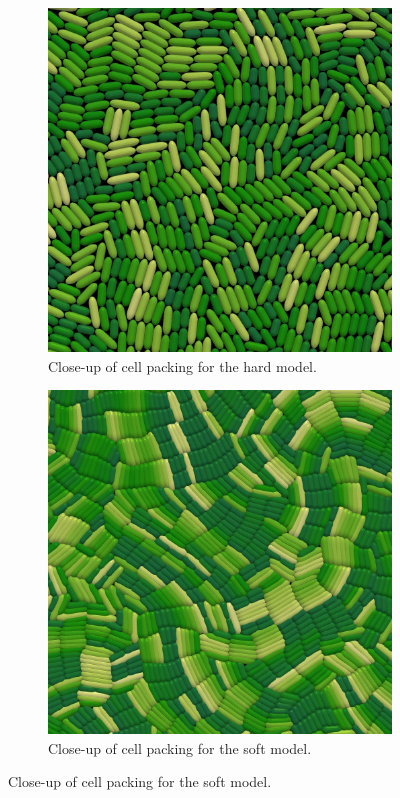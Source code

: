 \documentclass[conference]{IEEEtran}
\begin{document}
\begin{figure}[H]
    \centering
    \begin{subfigure}[b]{0.49\columnwidth}
        \centering
        \includegraphics[width=\linewidth]{figures/comparison_plots/density_hard.jpeg}
        \caption{Close-up of cell packing for the hard model.}
        \label{fig:packing_hard}
    \end{subfigure}
    \begin{subfigure}[b]{0.49\columnwidth}
        \centering
        \includegraphics[width=\linewidth]{figures/comparison_plots/density_soft.jpeg}
        \caption{Close-up of cell packing for the soft model.}
        \label{fig:packing_soft}
    \end{subfigure}


\end{figure}
\end{document}
